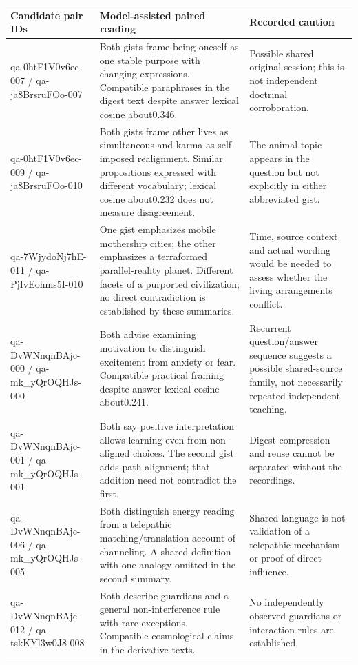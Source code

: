 \begingroup\footnotesize
\setlength{\tabcolsep}{3pt}
\begin{longtable}{p{}p{}p{}}
\toprule Candidate pair IDs & Model-assisted paired reading & Recorded caution \\ \midrule\endhead
qa-0htF1V0v6ec-007 / qa-ja8BrsruFOo-007 & Both gists frame being oneself as one stable purpose with changing expressions. Compatible paraphrases in the digest text despite answer lexical cosine about0.346. & Possible shared original session; this is not independent doctrinal corroboration. \\
qa-0htF1V0v6ec-009 / qa-ja8BrsruFOo-010 & Both gists frame other lives as simultaneous and karma as self-imposed realignment. Similar propositions expressed with different vocabulary; lexical cosine about0.232 does not measure disagreement. & The animal topic appears in the question but not explicitly in either abbreviated gist. \\
qa-7WjydoNj7hE-011 / qa-PjIvEohms5I-010 & One gist emphasizes mobile mothership cities; the other emphasizes a terraformed parallel-reality planet. Different facets of a purported civilization; no direct contradiction is established by these summaries. & Time, source context and actual wording would be needed to assess whether the living arrangements conflict. \\
qa-DvWNnqnBAjc-000 / qa-mk\_yQrOQHJs-000 & Both advise examining motivation to distinguish excitement from anxiety or fear. Compatible practical framing despite answer lexical cosine about0.241. & Recurrent question/answer sequence suggests a possible shared-source family, not necessarily repeated independent teaching. \\
qa-DvWNnqnBAjc-001 / qa-mk\_yQrOQHJs-001 & Both say positive interpretation allows learning even from non-aligned choices. The second gist adds path alignment; that addition need not contradict the first. & Digest compression and reuse cannot be separated without the recordings. \\
qa-DvWNnqnBAjc-006 / qa-mk\_yQrOQHJs-005 & Both distinguish energy reading from a telepathic matching/translation account of channeling. A shared definition with one analogy omitted in the second summary. & Shared language is not validation of a telepathic mechanism or proof of direct influence. \\
qa-DvWNnqnBAjc-012 / qa-tskKYl3w0J8-008 & Both describe guardians and a general non-interference rule with rare exceptions. Compatible cosmological claims in the derivative texts. & No independently observed guardians or interaction rules are established. \\

\end{longtable}
